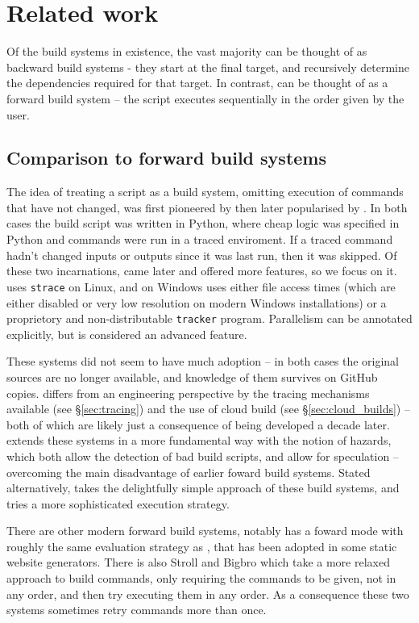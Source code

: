 \section{Related work}
\label{sec:related}

Of the build systems in existence, the vast majority can be thought of as backward build systems - they start at the final target, and recursively determine the dependencies required for that target. In contrast, \Rattle can be thought of as a forward build system -- the script executes sequentially in the order given by the user.

\subsection{Comparison to forward build systems}

The idea of treating a script as a build system, omitting execution of commands that have not changed, was first pioneered by \Memoize \cite{memoize} then later popularised by \Fabricate \cite{fabricate}. In both cases the build script was written in Python, where cheap logic was specified in Python and commands were run in a traced enviroment. If a traced command hadn't changed inputs or outputs since it was last run, then it was skipped. Of these two incarnations, \Fabricate came later and offered more features, so we focus on it. \Fabricate uses \texttt{strace} on Linux, and on Windows uses either file access times (which are either disabled or very low resolution on modern Windows installations) or a proprietory and non-distributable \texttt{tracker} program. Parallelism can be annotated explicitly, but is considered an advanced feature.

These systems did not seem to have much adoption -- in both cases the original sources are no longer available, and knowledge of them survives on GitHub copies. \Rattle differs from an engineering perspective by the tracing mechanisms available (see \S\ref{sec:tracing}) and the use of cloud build (see \S\ref{sec:cloud_builds}) -- both of which are likely just a consequence of being developed a decade later. \Rattle extends these systems in a more fundamental way with the notion of hazards, which both allow the detection of bad build scripts, and allow for speculation -- overcoming the main disadvantage of earlier foward build systems. Stated alternatively, \Rattle takes the delightfully simple approach of these build systems, and tries a more sophisticated execution strategy.

There are other modern forward build systems, notably \Shake has a foward mode with roughly the same evaluation strategy as \Memoize, that has been adopted in some static website generators. There is also Stroll and Bigbro which take a more relaxed approach to build commands, only requiring the commands to be given, not in any order, and then try executing them in any order. As a consequence these two systems sometimes retry commands more than once.

